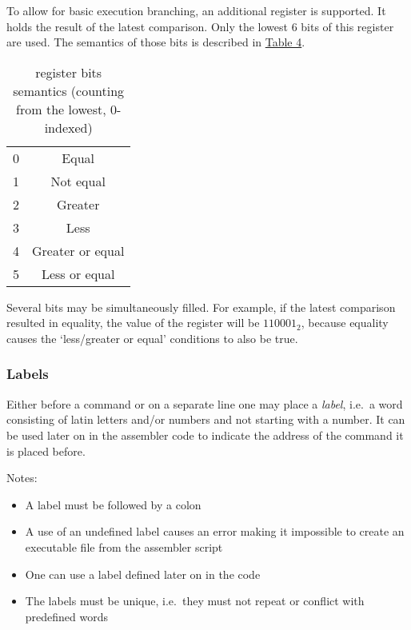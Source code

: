 To allow for basic execution branching, an additional  register is supported.
It holds the result of the latest comparison.
Only the lowest 6 bits of this register are used.
The semantics of those bits is described in \hyperlink{flags:bits}{Table 4}.

\hypertarget{flags:bits}{}
{
    \renewcommand{\arraystretch}{1.4}
    \begin{table}[h!]
        \centering
        \caption{ register bits semantics (counting from the lowest, 0-indexed)}
        \vspace{2mm}
        \begin{tabular}{| c | c |}
            \hline
            0 & Equal            \\
            1 & Not equal        \\
            2 & Greater          \\
            3 & Less             \\
            4 & Greater or equal \\
            5 & Less or equal    \\
            \hline
        \end{tabular}
    \end{table}
}

Several bits may be simultaneously filled.
For example, if the latest comparison resulted in equality, the value of the  register will be $110001_2$, because equality causes the `less/greater or equal' conditions to also be true.

\subsubsection{Labels}

Either before a command or on a separate line one may place a \textit{label}, i.e.\ a word consisting of latin letters and/or numbers and not starting with a number.
It can be used later on in the assembler code to indicate the address of the command it is placed before.

Notes:

\begin{itemize}
    \item A label must be followed by a colon
    \item A use of an undefined label causes an error making it impossible to create an executable file from the assembler script
    \item One can use a label defined later on in the code
    \item The labels must be unique, i.e.\ they must not repeat or conflict with predefined words
\end{itemize}

